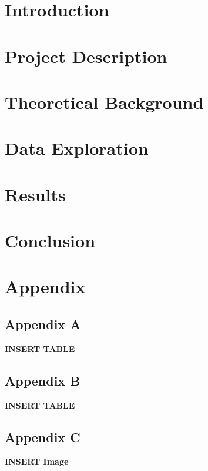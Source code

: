 \documentclass[a4paper, 12pt, oneside]{book}
\begin{document}
\chapter{Introduction}


\chapter{Project Description}

\chapter{Theoretical Background}
 

\chapter{Data Exploration}


\chapter{Results}

\chapter{Conclusion}


\chapter*{Appendix}

\section*{Appendix A}
\label{appendix:spectrumTable1}
\textbf{INSERT TABLE}

\section*{Appendix B}
\label{appendix:spectrumTable2}
\textbf{INSERT TABLE}

\section*{Appendix C}
\label{appendix:hierimg0}
\textbf{INSERT Image}
\end{document}
